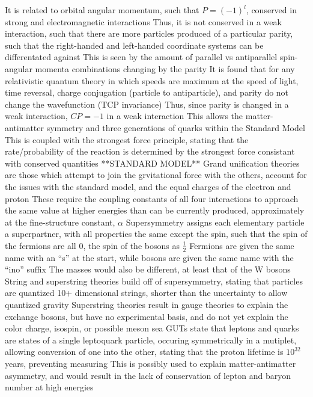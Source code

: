 \documentclass[11 pt, twoside]{article}
\newenvironment{outline*}
{
	\begin{outline}[enumerate]
	}
	{\end{outline}
}
\begin{document}
\begin{outline*}
		\3 It is related to orbital angular momentum, such that $P = (-1)^l$, conserved in strong and electromagnetic interactions
		\3 Thus, it is not conserved in a weak interaction, such that there are more particles produced of a particular parity, such that the right-handed and left-handed coordinate systems can be differentated against
			\4 This is seen by the amount of parallel vs antiparallel spin-angular momenta combinations changing by the parity
	\2 It is found that for any relativistic quantum theory in which speeds are maximum at the speed of light, time reversal, charge conjugation (particle to antiparticle), and parity do not change the wavefunction (TCP invariance)
		\3 Thus, since parity is changed in a weak interaction, $CP = -1$ in a weak interaction
		\3 This allows the matter-antimatter symmetry and three generations of quarks within the Standard Model
	\2 This is coupled with the strongest force principle, stating that the rate/probability of the reaction is determined by the strongest force consistant with conserved quantities
\1 **STANDARD MODEL**
\1 Grand unification theories are those which attempt to join the grvitational force with the others, account for the issues with the standard model, and the equal charges of the electron and proton
	\2 These require the coupling constants of all four interactions to approach the same value at higher energies than can be currently produced, approximately at the fine-structure constant, $\alpha$
	\2 Supersymmetry assigns each elementary particle a superpartner, with all properties the same except the spin, such that the spin of the fermions are all 0, the spin of the bosons as $\frac{1}{2}$
		\3 Fermions are given the same name with an ``s'' at the start, while bosons are given the same name with the ``ino'' suffix
		\3 The masses would also be different, at least that of the W bosons
		\3 String and superstring theories build off of supersymmetry, stating that particles are quantized 10+ dimensional strings, shorter than the uncertainty to allow quantized gravity
			\4 Superstring theories result in gauge theories to explain the exchange bosons, but have no experimental basis, and do not yet explain the color charge, isospin, or possible meson sea
	\2 GUTs state that leptons and quarks are states of a single leptoquark particle, occuring symmetrically in a mutiplet, allowing conversion of one into the other, stating that the proton lifetime is $10^32$ years, preventing measuring
		\3 This is possibly used to explain matter-antimatter asymmetry, and would result in the lack of conservation of lepton and baryon number at high energies

\end{outline*}
\end{document}
